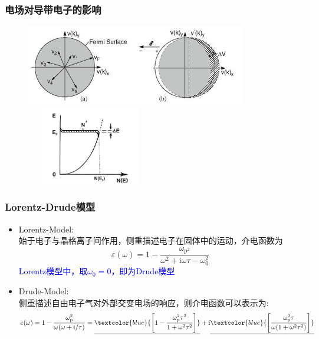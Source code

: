 \frame
{
	\frametitle{电场对导带电子的影响}
\begin{figure}[h!]
\centering
\vspace*{-13pt}
\includegraphics[height=1.4in,width=3.8in,viewport=0 0 480 180,clip]{Figures/Electrmagnetic_Fermi-surface-1.jpg}
\includegraphics[height=1.35in,width=2.2in,viewport=0 0 200 130,clip]{Figures/Electrmagnetic_Fermi-surface-2.jpg}
\caption{\fontsize{5.5pt}{4.2pt}}%
\label{CB-Electron-in-E}
\end{figure} 
}

\frame
{
	\frametitle{\textrm{Lorentz-Drude}模型}
\begin{itemize}
	\item \textrm{Lorentz-Model}:\\
		始于电子与晶格离子间作用，侧重描述电子在固体中的运动，介电函数为
		\begin{displaymath}
			\varepsilon(\omega)=1-\dfrac{\omega_{\mathrm{p}^2}}{\omega^2+\mathrm{i}\omega\tau-\omega_0^2}
		\end{displaymath}
		\textcolor{blue}{\textrm{Lorentz}模型中，取$\omega_0=0$，即为\textrm{Drude}模型}
	\item \textrm{Drude-Model}:\\
		侧重描述自由电子气对外部交变电场的响应，则介电函数可以表示为:
			\begin{displaymath}
				\varepsilon(\omega)=1-\frac{\omega_\mathrm{p}^2}{\omega(\omega+\mathrm{i}/\tau)}=\underline{\textcolor{blue}{\left[ 1-\frac{\omega_{\mathrm{p}}^2\tau^2}{1+\omega^2\tau^2} \right]}}+\mathrm{i}\underline{\textcolor{blue}{\left[ \frac{\omega_{\mathrm{p}}^2\tau}{\omega(1+\omega^2\tau^2)} \right]}}
			\end{displaymath}
\end{itemize}
}


